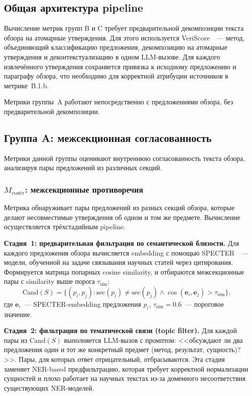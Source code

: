 \documentclass[a4paper,14pt]{extarticle}
\begin{document}
\subsection{Общая архитектура pipeline}

Вычисление метрик групп B и C требует предварительной декомпозиции текста обзора на атомарные утверждения. Для этого используется VeriScore~\cite{song2024veriscore}~--- метод, объединяющий классификацию предложения, декомпозицию на атомарные утверждения и деконтекстуализацию в одном LLM-вызове. Для каждого извлечённого утверждения сохраняется привязка к исходному предложению и параграфу обзора, что необходимо для корректной атрибуции источников в метрике~B.1.b.

Метрики группы~A работают непосредственно с предложениями обзора, без предварительной декомпозиции.


\subsection{Группа A: межсекционная согласованность}

Метрики данной группы оценивают внутреннюю согласованность текста обзора, анализируя пары предложений из различных секций.

\subsubsection{$M_\mathrm{contr}$: межсекционные противоречия}

Метрика обнаруживает пары предложений из разных секций обзора, которые делают несовместимые утверждения об одном и том же предмете. Вычисление осуществляется трёхстадийным pipeline.

\textbf{Стадия~1: предварительная фильтрация по семантической близости.} Для каждого предложения обзора вычисляется embedding с помощью SPECTER~\cite{cohan2020specter}~--- модели, обученной на задаче связывания научных статей через цитирования. Формируется матрица попарных cosine similarity, и отбираются межсекционные пары с similarity выше порога $\tau_\mathrm{sim}$:
\begin{equation}
    \mathrm{Cand}(S) = \{(p_i, p_j) : \mathrm{sec}(p_i) \ne \mathrm{sec}(p_j) \wedge \cos(\mathbf{e}_i, \mathbf{e}_j) > \tau_\mathrm{sim}\},
\end{equation}
где $\mathbf{e}_i$~--- SPECTER-embedding предложения $p_i$, $\tau_\mathrm{sim} = 0.6$~--- пороговое значение.

\textbf{Стадия~2: фильтрация по тематической связи (topic filter).} Для каждой пары из $\mathrm{Cand}(S)$ выполняется LLM-вызов с промптом: <<обсуждают ли два предложения один и тот же конкретный предмет (метод, результат, сущность)?>>. Пары, для которых ответ отрицательный, отбрасываются. Эта стадия заменяет NER-based предфильтрацию, которая требует корректной нормализации сущностей и плохо работает на научных текстах из-за доменного несоответствия существующих NER-моделей.
\end{document}
